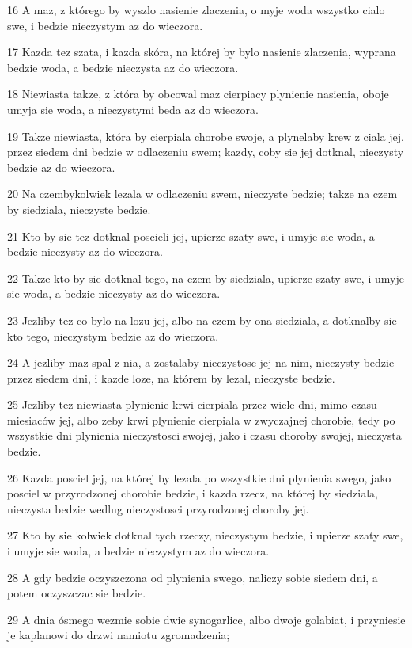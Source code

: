\par 16 A maz, z którego by wyszlo nasienie zlaczenia, o myje woda wszystko cialo swe, i bedzie nieczystym az do wieczora.
\par 17 Kazda tez szata, i kazda skóra, na której by bylo nasienie zlaczenia, wyprana bedzie woda, a bedzie nieczysta az do wieczora.
\par 18 Niewiasta takze, z która by obcowal maz cierpiacy plynienie nasienia, oboje umyja sie woda, a nieczystymi beda az do wieczora.
\par 19 Takze niewiasta, która by cierpiala chorobe swoje, a plynelaby krew z ciala jej, przez siedem dni bedzie w odlaczeniu swem; kazdy, coby sie jej dotknal, nieczysty bedzie az do wieczora.
\par 20 Na czembykolwiek lezala w odlaczeniu swem, nieczyste bedzie; takze na czem by siedziala, nieczyste bedzie.
\par 21 Kto by sie tez dotknal poscieli jej, upierze szaty swe, i umyje sie woda, a bedzie nieczysty az do wieczora.
\par 22 Takze kto by sie dotknal tego, na czem by siedziala, upierze szaty swe, i umyje sie woda, a bedzie nieczysty az do wieczora.
\par 23 Jezliby tez co bylo na lozu jej, albo na czem by ona siedziala, a dotknalby sie kto tego, nieczystym bedzie az do wieczora.
\par 24 A jezliby maz spal z nia, a zostalaby nieczystosc jej na nim, nieczysty bedzie przez siedem dni, i kazde loze, na którem by lezal, nieczyste bedzie.
\par 25 Jezliby tez niewiasta plynienie krwi cierpiala przez wiele dni, mimo czasu miesiaców jej, albo zeby krwi plynienie cierpiala w zwyczajnej chorobie, tedy po wszystkie dni plynienia nieczystosci swojej, jako i czasu choroby swojej, nieczysta bedzie.
\par 26 Kazda posciel jej, na której by lezala po wszystkie dni plynienia swego, jako posciel w przyrodzonej chorobie bedzie, i kazda rzecz, na której by siedziala, nieczysta bedzie wedlug nieczystosci przyrodzonej choroby jej.
\par 27 Kto by sie kolwiek dotknal tych rzeczy, nieczystym bedzie, i upierze szaty swe, i umyje sie woda, a bedzie nieczystym az do wieczora.
\par 28 A gdy bedzie oczyszczona od plynienia swego, naliczy sobie siedem dni, a potem oczyszczac sie bedzie.
\par 29 A dnia ósmego wezmie sobie dwie synogarlice, albo dwoje golabiat, i przyniesie je kaplanowi do drzwi namiotu zgromadzenia;
